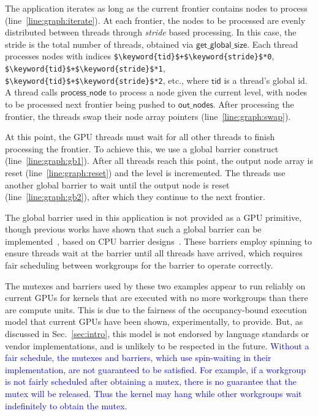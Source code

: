 \documentclass[sigconf]{acmart}
\newcommand{\TSAdded}[1]{\textcolor{blue}{#1}}
\newcommand{\mysec}{Sec.~}
\newcommand{\code}[1]{\lstset{basicstyle=\tt}\lstinline!#1!\lstset{basicstyle=\scriptsize\tt}}
\newcommand{\getglobalsize}{\mathsf{get\_global\_size}}
\newcommand{\keyword}[1]{\mathsf{#1}}
\begin{document}
The application iterates as long as the current frontier contains
nodes to process (line~\ref{line:graph:iterate}). At each frontier,
the nodes to be processed are evenly distributed between
threads through \emph{stride} based processing.
%
In this case, the stride is the total number of threads, obtained via
$\getglobalsize$.  Each thread processes nodes with indices
\code{$\keyword{tid}$+$\keyword{stride}$*0},
\code{$\keyword{tid}$+$\keyword{stride}$*1},
\code{$\keyword{tid}$+$\keyword{stride}$*2}, etc., where $\keyword{tid}$ is a thread's global id.
A thread calls $\keyword{process\_node}$ to process a node given the current level, with nodes to be processed next frontier being pushed to $\keyword{out\_nodes}$. After processing the frontier, the threads swap their
node array pointers (line~\ref{line:graph:swap}).

At this point, the GPU threads must wait for all other threads to
finish processing the frontier. To achieve
this, we use a global barrier construct
(line~\ref{line:graph:gb1}). After all threads reach this point, the
output node array is reset (line~\ref{line:graph:reset}) and the level
is incremented. The threads use another global barrier to wait until the output node is
reset (line~\ref{line:graph:gb2}), after which they continue to the next frontier.

The global barrier used in this application is not provided as a GPU
primitive, though previous works have shown that such a global barrier
can be implemented~\cite{XF10,DBLP:conf/oopsla/SorensenDBGR16}, based
on CPU barrier designs~\cite[ch. 17]{HS08}.  These barriers employ
spinning to ensure threads wait at the barrier until all threads have
arrived, which requires fair scheduling between workgroups for the
barrier to operate correctly.


The mutexes and barriers used by these two examples appear to run
reliably on current GPUs for kernels that are executed with no more
workgroups than there are compute units.  This is due to the fairness
of the occupancy-bound execution model that current GPUs have been
shown, experimentally, to provide.  But, as discussed in
\mysec\ref{sec:intro}, this model is not endorsed by language
standards or vendor implementations, and is unlikely to be respected
in the future. \TSAdded{Without a fair schedule, the mutexes and
  barriers, which use spin-waiting in their implementation, are not
  guaranteed to be satisfied. For example, if a workgroup is not
  fairly scheduled after obtaining a mutex, there is no guarantee that
  the mutex will be released. Thus the kernel may hang while other
  workgroups wait indefinitely to obtain the mutex. }
%
\end{document}
